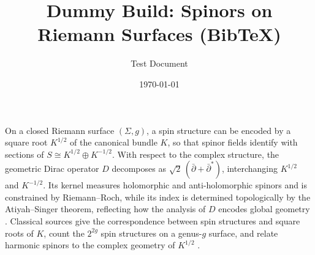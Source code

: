 \documentclass[11pt,a4paper]{article}
\title{Dummy Build: Spinors on Riemann Surfaces (BibTeX)}
\author{Test Document}
\date{\today}
\begin{document}
\maketitle

On a closed Riemann surface $(\Sigma,g)$, a spin structure can be encoded by a square root $K^{1/2}$ of the canonical bundle $K$, so that spinor fields identify with sections of $S \cong K^{1/2} \oplus K^{-1/2}$. With respect to the complex structure, the geometric Dirac operator $D$ decomposes as $\sqrt{2}\,(\bar\partial + \bar\partial^{\!*})$, interchanging $K^{1/2}$ and $K^{-1/2}$. Its kernel measures holomorphic and anti-holomorphic spinors and is constrained by Riemann–Roch, while its index is determined topologically by the Atiyah–Singer theorem, reflecting how the analysis of $D$ encodes global geometry \citep{atiyah-singer-1968,friedrich-2000}. Classical sources give the correspondence between spin structures and square roots of $K$, count the $2^{2g}$ spin structures on a genus-$g$ surface, and relate harmonic spinors to the complex geometry of $K^{1/2}$ \citep{lawson-michelsohn-1989}.


\end{document}

